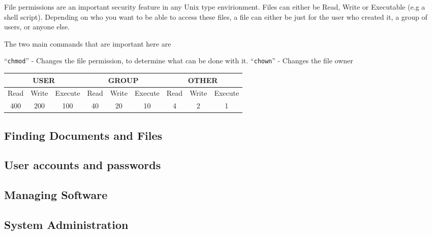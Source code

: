 \documentclass{extbook}
\begin{document}
File permissions are an important security feature in any Unix type envirionment.  Files can either be Read, Write or Executable (e.g a shell script).  Depending on who you want to be able to access these files,  a file can either be just for the user who created it, a group of users, or anyone else.  

The two main commands that are important here are

``\verb|chmod|'' - Changes the file permission, to determine what can be done with it. 
``\verb|chown|'' - Changes the file owner

\begin{table}[h]
\begin{tabular}{|ccc|ccc|ccc|}
\hline
\multicolumn{3}{|c|}{\textbf{USER}}                               & \multicolumn{3}{c|}{\textbf{GROUP}}                              & \multicolumn{3}{c|}{\textbf{OTHER}}                              \\ \hline
\multicolumn{1}{|c|}{Read} & \multicolumn{1}{c|}{Write} & Execute & \multicolumn{1}{c|}{Read} & \multicolumn{1}{c|}{Write} & Execute & \multicolumn{1}{c|}{Read} & \multicolumn{1}{c|}{Write} & Execute \\ \hline
\multicolumn{1}{|c|}{400}  & \multicolumn{1}{c|}{200}   & 100     & \multicolumn{1}{c|}{40}   & \multicolumn{1}{c|}{20}    & 10      & \multicolumn{1}{c|}{4}    & \multicolumn{1}{c|}{2}     & 1       \\ \hline
\end{tabular}
\end{table}


\subsection{Finding Documents and Files}
\subsection{User accounts and passwords}
\subsection{Managing Software}
\subsection{System Administration}
\end{document}
